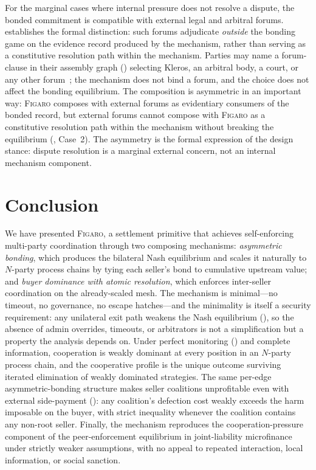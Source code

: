 \documentclass[11pt,a4paper]{article}
\theoremstyle{definition}
\theoremstyle{remark}
\newcommand{\figaro}{\textsc{Figaro}}
\begin{document}
For the marginal cases where internal pressure does not resolve a
dispute, the bonded commitment is compatible with external legal
and arbitral forums.  establishes the
formal distinction: such forums adjudicate \emph{outside} the
bonding game on the evidence record produced by the mechanism, rather
than serving as a constitutive resolution path within the
mechanism. Parties may name a forum-clause in their assembly graph
() selecting Kleros, an arbitral
body, a court, or any other forum~\citep{kleros2019}; the mechanism
does not bind a forum, and the choice does not affect the bonding
equilibrium. The composition is asymmetric in an important way:
\figaro{} composes with external forums as evidentiary consumers
of the bonded record, but external forums cannot compose with
\figaro{} as a constitutive resolution path within the mechanism
without breaking the equilibrium (,
Case~2). The asymmetry is the formal expression of the design
stance: dispute resolution is a marginal external concern, not an
internal mechanism component.

\section{Conclusion}
\label{sec:conclusion}

We have presented \figaro{}, a settlement primitive that achieves
self-enforcing multi-party coordination through two composing
mechanisms: \emph{asymmetric bonding}, which produces the bilateral
Nash equilibrium and scales it naturally to $N$-party process chains
by tying each seller's bond to cumulative upstream value; and
\emph{buyer dominance with atomic resolution}, which enforces
inter-seller coordination on the already-scaled mesh. The mechanism is
minimal---no timeout, no governance, no escape hatches---and the
minimality is itself a security requirement: any unilateral exit
path weakens the Nash equilibrium
(), so the absence of admin overrides,
timeouts, or arbitrators is not a simplification but a property the
analysis depends on. Under perfect monitoring
() and complete information, cooperation is
weakly dominant at every position in an $N$-party process chain, and
the cooperative profile is the unique outcome surviving iterated
elimination of weakly dominated strategies. The same per-edge
asymmetric-bonding structure makes seller coalitions unprofitable
even with external side-payment
(): any coalition's defection cost
weakly exceeds the harm imposable on the buyer, with strict
inequality whenever the coalition contains any non-root seller.
Finally, the mechanism reproduces the cooperation-pressure
component of the peer-enforcement equilibrium in joint-liability
microfinance under strictly weaker assumptions, with no appeal to
repeated interaction, local information, or social sanction.
\end{document}
